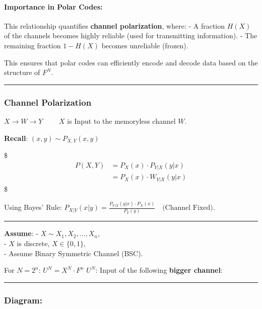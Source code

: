 \documentclass[11pt]{article}
\begin{document}
\paragraph{Importance in Polar Codes:}\label{importance-in-polar-codes}

This relationship quantifies \textbf{channel polarization}, where: - A
fraction \(H(X)\) of the channels becomes highly reliable (used for
transmitting information). - The remaining fraction \(1 - H(X)\) becomes
unreliable (frozen).

This ensures that polar codes can efficiently encode and decode data
based on the structure of \(F^N\).

    \begin{center}\rule{0.5\linewidth}{0.5pt}\end{center}

\subsubsection{Channel Polarization}\label{channel-polarization}

\(X \to \boxed{ W } \to Y\) \(\qquad X\) is Input to the memoryless
channel \(W\).

\textbf{Recall}: \((x, y) \sim P_{X,Y}(x, y)\)

\$ \begin{align}
P(X, Y) &= P_X(x) \cdot P_{Y|X}(y|x) \\
        &= P_X(x) \cdot W_{Y|X}(y|x)
\end{align} \$

Using Bayes' Rule:
\(P_{X|Y}(x|y) = \frac{P_{Y|X}(y|x) \cdot P_X(x)}{P_Y(y)} \quad \text{(Channel Fixed)}.\)

\begin{center}\rule{0.5\linewidth}{0.5pt}\end{center}

\textbf{Assume}: - \(X \sim X_1, X_2, \dots, X_n\),\\
- \(X\) is discrete, \(X \in \{0, 1\}\),\\
- Assume Binary Symmetric Channel (BSC).

For \(N = 2^n\): \(U^N = X^N \cdot F^n\) \(U^N\): Input of the following
\textbf{bigger channel}:

\begin{center}\rule{0.5\linewidth}{0.5pt}\end{center}

\subsubsection{Diagram:}\label{diagram}
\end{document}
